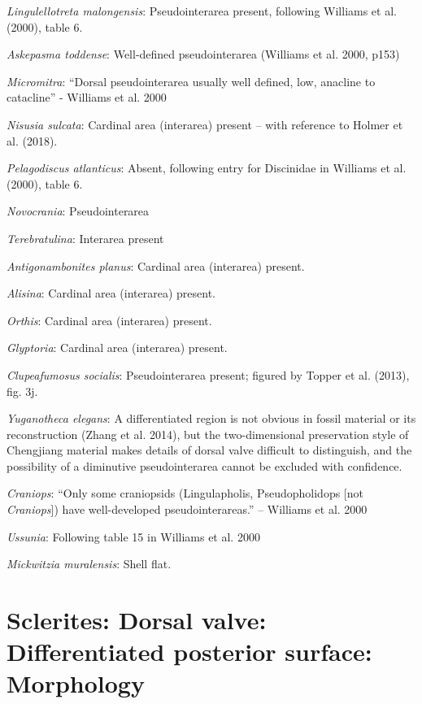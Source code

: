 \documentclass[]{book}
\theoremstyle{definition}
\theoremstyle{definition}
\theoremstyle{definition}
\theoremstyle{remark}
\begin{document}
\emph{Lingulellotreta malongensis}: Pseudointerarea present, following
Williams et al. (2000), table 6.

\emph{Askepasma toddense}: Well-defined pseudointerarea (Williams et al.
2000, p153)

\emph{Micromitra}: ``Dorsal pseudointerarea usually well defined, low,
anacline to catacline'' - Williams et al. 2000

\emph{Nisusia sulcata}: Cardinal area (interarea) present -- with
reference to Holmer et al. (2018).

\emph{Pelagodiscus atlanticus}: Absent, following entry for Discinidae
in Williams et al. (2000), table 6.

\emph{Novocrania}: Pseudointerarea

\emph{Terebratulina}: Interarea present

\emph{Antigonambonites planus}: Cardinal area (interarea) present.

\emph{Alisina}: Cardinal area (interarea) present.

\emph{Orthis}: Cardinal area (interarea) present.

\emph{Glyptoria}: Cardinal area (interarea) present.

\emph{Clupeafumosus socialis}: Pseudointerarea present; figured by
Topper et al. (2013), fig. 3j.

\emph{Yuganotheca elegans}: A differentiated region is not obvious in
fossil material or its reconstruction (Zhang et al. 2014), but the
two-dimensional preservation style of Chengjiang material makes details
of dorsal valve difficult to distinguish, and the possibility of a
diminutive pseudointerarea cannot be excluded with confidence.

\emph{Craniops}: ``Only some craniopsids (Lingulapholis, Pseudopholidops
{[}not \emph{Craniops}{]}) have well-developed pseudointerareas.'' --
Williams et al. 2000

\emph{Ussunia}: Following table 15 in Williams et al. 2000

\emph{Mickwitzia muralensis}: Shell flat.

\hypertarget{sclerites-dorsal-valve-differentiated-posterior-surface-morphology}{%
\section*{Sclerites: Dorsal valve: Differentiated posterior surface:
Morphology}\label{sclerites-dorsal-valve-differentiated-posterior-surface-morphology}}
\end{document}
